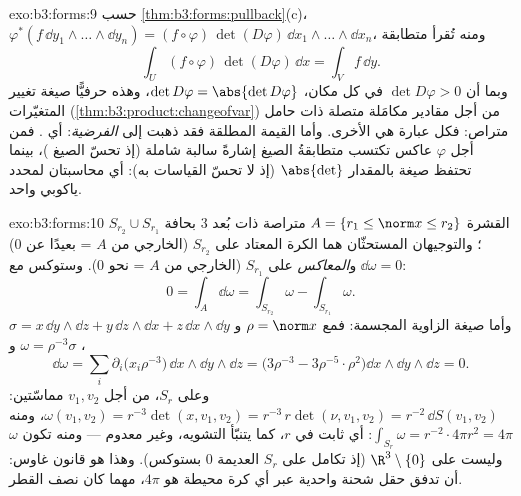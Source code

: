 \begin{solution}{exo:b3:forms:9}
حسب \cref{thm:b3:forms:pullback}(c)، $\varphi^*(f\,\dd y_1\wedge\dots\wedge\dd y_n) =
(f\circ\varphi)\,\det(D\varphi)\,\dd
x_1\wedge\dots\wedge\dd x_n$، ومنه تُقرأ متطابقة 
\[
\int_U(f\circ\varphi)\,\det(D\varphi)\,\dd x = \int_Vf\,\dd
y .
\]
وبما أن $\det D\varphi > 0$ في كل مكان، $\det D\varphi =
\abs{\det D\varphi}$، وهذه حرفيًّا صيغة تغيير
المتغيّرات (\cref{thm:b3:product:changeofvar}) من أجل مقادير مكامَلة متصلة ذات حامل
متراص: فكل عبارة هي الأخرى. وأما القيمة المطلقة فقد ذهبت إلى
\emph{الفرضية}: أي . فمن أجل $\varphi$ عاكس 
تكتسب متطابقةُ الصيغ إشارةً سالبة شاملة (إذ تحسّ الصيغ
)، بينما تحتفظ صيغة  بالمقدار $\abs{\det}$ (إذ
لا تحسّ القياسات به): أي محاسبتان لمحدد ياكوبي واحد.
\end{solution}

\begin{solution}{exo:b3:forms:10}
القشرة $A = \{r_1 \leq \norm x \leq r_2\}$  متراصة ذات بُعد $3$ بحافة $S_{r_2}\cup S_{r_1}$؛
والتوجيهان المستحثّان هما  الكرة المعتاد على $S_{r_2}$
(الخارجي من $A$ = بعيدًا عن $0$) و\emph{المعاكس} على $S_{r_1}$
(الخارجي من $A$ = نحو $0$). وستوكس مع $\dd\omega = 0$:
\[
0 = \int_A\dd\omega = \int_{S_{r_2}}\omega -
\int_{S_{r_1}}\omega .
\]
وأما صيغة الزاوية المجسمة: فمع $\rho = \norm x$ و $\sigma =
x\,\dd y\wedge\dd z + y\,\dd z\wedge\dd x + z\,\dd
x\wedge\dd y$،
$\omega = \rho^{-3}\sigma$ و
\[
\dd\omega = \sum_i\partial_i\bigl(x_i\rho^{-3}\bigr)\,
\dd x\wedge\dd y\wedge\dd z
= \bigl(3\rho^{-3} - 3\rho^{-5}\cdot\rho^2\bigr)\dd
x\wedge\dd y\wedge\dd z = 0 .
\]
وعلى $S_r$، من أجل $v_1, v_2$ مماسّتين: $\omega(v_1, v_2) =
r^{-3}\det(x, v_1, v_2) = r^{-3}\,r\det(\nu, v_1, v_2) =
r^{-2}\,\dd S(v_1, v_2)$، ومنه $\int_{S_r}\omega =
r^{-2}\cdot4\pi r^2 = 4\pi$:
أي ثابت في $r$، كما يتنبّأ التشويه، وغير معدوم --- ومنه تكون
$\omega$  وليست  على $\R^3\setminus\{0\}$ (إذ تكامل  على
$S_r$ العديمة  $0$ بستوكس). وهذا هو قانون غاوس: أن تدفق
حقل شحنة واحدية عبر أي كرة محيطة هو $4\pi$، مهما كان نصف
القطر.
\end{solution}

